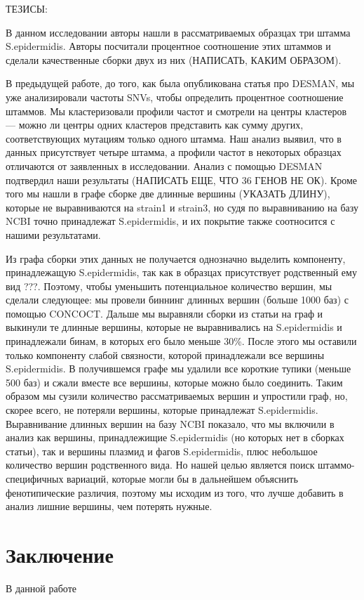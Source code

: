 \documentclass{spbau-diploma}
\begin{document}
ТЕЗИСЫ:

В данном исследовании авторы нашли в рассматриваемых образцах три штамма S.epidermidis. Авторы посчитали процентное соотношение этих штаммов и сделали качественные сборки двух из них (НАПИСАТЬ, КАКИМ ОБРАЗОМ).

В предыдущей работе, до того, как была опубликована статья про DESMAN, мы уже анализировали частоты SNVs, чтобы определить процентное соотношение штаммов. Мы кластеризовали профили частот и смотрели на центры кластеров --- можно ли центры одних кластеров представить как сумму других, соответствующих мутациям только одного штамма. Наш анализ выявил, что в данных присутствует четыре штамма, а профили частот в некоторых образцах отличаются от заявленных в исследовании. Анализ с помощью DESMAN подтвердил наши результаты (НАПИСАТЬ ЕЩЕ, ЧТО 36 ГЕНОВ НЕ ОК). Кроме того мы нашли в графе сборке две длинные вершины (УКАЗАТЬ ДЛИНУ), которые не выравниваются на strain1 и strain3, но судя по выравниванию на базу NCBI точно принадлежат S.epidermidis, и их покрытие также соотносится с нашими результатами.

Из графа сборки этих данных не получается однозначно выделить компоненту, принадлежащую S.epidermidis, так как в образцах присутствует родственный ему вид ???. Поэтому, чтобы уменьшить потенциальное количество вершин, мы сделали следующее: мы провели биннинг длинных вершин (больше 1000 баз) с помощью CONCOCT. Дальше мы выравняли сборки из статьи на граф и выкинули те длинные вершины, которые не выравнивались на S.epidermidis и принадлежали бинам, в которых его было меньше 30\%. После этого мы оставили только компоненту слабой связности, которой принадлежали все вершины S.epidermidis. В получившемся графе мы удалили все короткие тупики (меньше 500 баз) и сжали вместе все вершины, которые можно было соединить. Таким образом мы сузили количество рассматриваемых вершин и упростили граф, но, скорее всего, не потеряли вершины, которые принадлежат S.epidermidis. Выравнивание длинных вершин на базу NCBI показало, что мы включили в анализ как вершины, принадлежищие S.epidermidis (но которых нет в сборках статьи), так и вершины плазмид и фагов S.epidermidis, плюс небольшое количество вершин родственного вида. Но нашей целью является поиск штаммо-специфичных вариаций, которые могли бы в дальнейшем объяснить фенотипические различия, поэтому мы исходим из того, что лучше добавить в анализ лишние вершины, чем потерять нужные.




\section*{Заключение}
В данной работе
\end{document}
